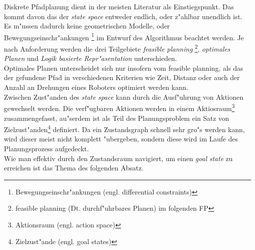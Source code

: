 Diskrete Pfadplanung dient in der meisten Literatur als Einstiegspunkt. Das kommt davon das der \textit{state space} entweder endlich, oder z"ahlbar unendlich ist.\\
Es m"ussen dadurch keine geometrischen Modelle, oder Bewegungseinschr"ankungen \footnote{Bewegungseinschr"ankungen (engl. differential constraints)} im Entwurf des Algorithmus beachtet werden.
Je nach Anforderung werden die drei Teilgebiete \textit{feasible planning} \footnote{feasible planning (Dt. durchf"uhrbares Planen) im folgenden FP}, \textit{optimales Planen} und \textit{Logik basierte Repr"asentation} unterschieden.\cite[~S. 27]{Lav06}\\
Optimales Planen unterscheidet sich nur insofern vom feasible planning, als das der gefundene Pfad in verschiedenen Kriterien wie Zeit, Distanz oder auch der Anzahl an Drehungen eines Roboters optimiert werden kann.\cite[~S. 43]{Lav06} \\
Zwischen Zust"anden des \textit{state space} kann durch die Ausf"uhrung von Aktionen gewechselt werden. Die verf"ugbaren Aktionen werden in einem Aktiosraum\footnote{Aktionsraum (engl. action space) } zusammengefasst, au"serdem ist als Teil des Planungsproblem ein Satz von Zielzust"anden\footnote{Zielzust"ande (engl. goal states)} definiert. 
Da ein Zustandsgraph schnell sehr gro"s werden kann, wird dieser meist nicht komplett "ubergeben, sondern diese wird im Laufe des Planungsprozess aufgedeckt.
\cite[~S. 43]{Lav06} \\
Wie man effektiv durch den Zustandsraum navigiert, um einen \textit{goal state} zu erreichen ist das Thema des folgenden Absatz.
